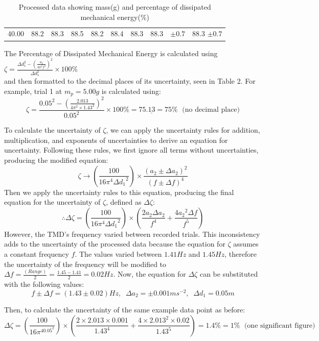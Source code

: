 \documentclass[11pt]{article}
\begin{document}
\begin{table}[h]
\begin{tabular}{cccccccccc}
\rowcolor[HTML]{EFEFEF}
40.00                                                 & \multicolumn{1}{r}{\cellcolor[HTML]{EFEFEF}88.2} & \multicolumn{1}{r}{\cellcolor[HTML]{EFEFEF}88.3} & \multicolumn{1}{r}{\cellcolor[HTML]{EFEFEF}88.5} & \multicolumn{1}{r}{\cellcolor[HTML]{EFEFEF}88.2} & \multicolumn{1}{r}{\cellcolor[HTML]{EFEFEF}88.4} & \multicolumn{1}{r}{\cellcolor[HTML]{EFEFEF}88.3} & \multicolumn{1}{r}{\cellcolor[HTML]{EFEFEF}88.3} & $\pm 0.7$                                                          & 88.3 $\pm 0.7$
\end{tabular}
\caption{\label{tbl:2}Processed data showing mass(g) and percentage of dissipated mechanical energy($\%$)}
\end{table}


The Percentage of Dissipated Mechanical Energy is calculated using $\zeta=\frac{\Delta d_1^2-(\frac{a_2}{4\pi^2f^2})^2}{\Delta d_1^2} \times 100\%$ \\
and then formatted to the decimal places of its uncertainty, seen in Table 2.
For example, trial 1 at $m_p=5.00g$ is calculated using:
$$\zeta=\frac{0.05^2-(\frac{2.013}{4\pi^2\times1.43^2})^2}{0.05^2} \times 100\% = 75.\underline{13}=75 \% \; \textrm{  (no decimal place)}$$

To calculate the uncertainty of $\zeta$, we can apply the uncertainty rules for addition, multiplication, and exponents of uncertainties to derive an equation for uncertainty. Following these rules, we first ignore all terms without uncertainties, producing the modified equation:
$$\zeta \rightarrow (\frac{100}{16\pi^4\Delta {d_1}^2}) \times \frac{(a_2 \pm \Delta a_2)^2}{(f \pm \Delta f)^4}$$
Then we apply the uncertainty rules to this equation, producing the final equation for the uncertainty of $\zeta$, defined as $\Delta \zeta$:
$$ \therefore \Delta \zeta = (\frac{100}{16\pi^4\Delta {d_1}^2})\times(\frac{2a_2 \Delta a_2}{f^4} + \frac{4{a_2}^2\Delta f}{f^5})$$
However, the TMD's frequency varied between recorded trials. This inconsistency adds to the uncertainty of the processed data because the equation for $\zeta$ assumes a constant frequency $f$. The values varied between $1.41Hz$ and $1.45Hz$, therefore the uncertainty of the frequency will be modified to $\Delta f = \frac{(Range)}{2} = \frac{1.45-1.41}{2} = 0.02Hz$. Now, the equation for $\Delta \zeta$ can be substituted with the following values:
$$f \pm \Delta f = (1.43 \pm 0.02)Hz, \; \; \Delta a_2 = \pm 0.001ms^{-2}, \; \; \Delta d_1 = 0.05m$$


Then, to calculate the uncertainty of the same example data point as before:
$$\Delta \zeta = (\frac{100}{16\pi^40.05^2})\times(\frac{2\times2.013 \times0.001}{1.43^4} + \frac{4\times2.013^2\times0.02}{1.43^5})=1.4\% = 1\% \; \textrm{  (one significant figure)}$$
\end{document}
